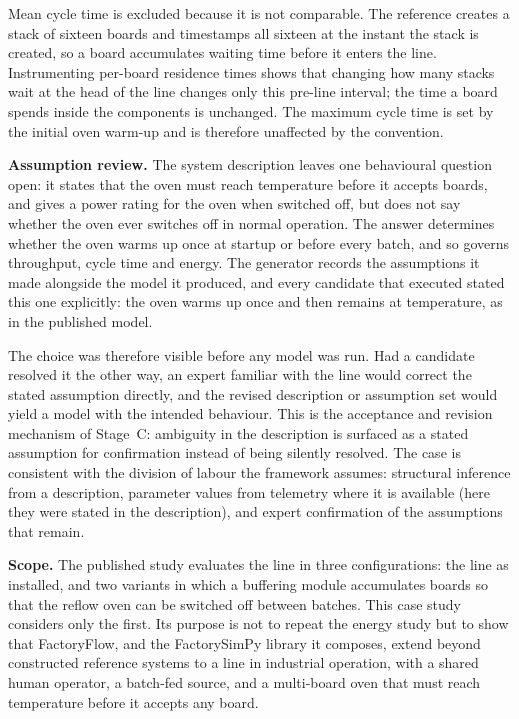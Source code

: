 Mean cycle time is excluded because it is not comparable. The reference creates a stack of
sixteen boards and timestamps all sixteen at the instant the stack is created, so a board
accumulates waiting time before it enters the line. Instrumenting per-board residence
times shows that changing how many stacks wait at the head of the line changes only this
pre-line interval; the time a board spends inside the components is unchanged. The maximum
cycle time is set by the initial oven warm-up and is therefore unaffected by the
convention.

\noindent\textbf{Assumption review.} The system description leaves one behavioural
question open: it states that the oven must reach temperature before it accepts boards,
and gives a power rating for the oven when switched off, but does not say whether the oven
ever switches off in normal operation. The answer determines whether the oven warms up
once at startup or before every batch, and so governs throughput, cycle time and energy.
The generator records the assumptions it made alongside the model it produced, and every
candidate that executed stated this one explicitly: the oven warms up once and then
remains at temperature, as in the published model.

The choice was therefore visible before any model was run. Had a candidate resolved it the
other way, an expert familiar with the line would correct the stated assumption directly,
and the revised description or assumption set would yield a model with the intended
behaviour. This is the acceptance and revision mechanism of Stage~C: ambiguity in the
description is surfaced as a stated assumption for confirmation instead of being silently
resolved. The case is consistent with the division of labour the framework assumes:
structural inference from a description, parameter values from telemetry where it is
available (here they were stated in the description), and expert confirmation of the
assumptions that remain.

\noindent\textbf{Scope.} The published study evaluates the line in three
configurations: the line as installed, and two variants in which a buffering
module accumulates boards so that the reflow oven can be switched off between
batches. This case study considers only the first. Its purpose is not to repeat
the energy study but to show that FactoryFlow, and the FactorySimPy library it
composes, extend beyond constructed reference systems to a line in industrial
operation, with a shared human operator, a batch-fed source, and a multi-board
oven that must reach temperature before it accepts any board.

